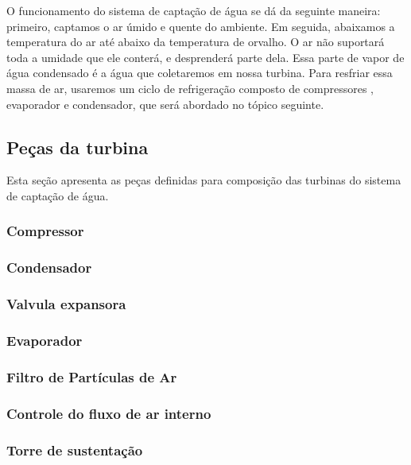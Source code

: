       O funcionamento do sistema de captação de água se dá da seguinte maneira: primeiro, captamos o ar úmido e quente do ambiente.
      Em seguida, abaixamos a temperatura do ar até abaixo da temperatura de orvalho. O ar não suportará toda a umidade que ele
      conterá, e desprenderá parte dela. Essa parte de vapor de água condensado é a água que coletaremos em nossa turbina. 
      Para resfriar essa massa de ar, usaremos um ciclo de refrigeração composto de compressores , evaporador e condensador,
      que será abordado no tópico seguinte.
    
    \subsection{Peças da turbina}
      
      Esta seção apresenta as peças definidas para composição das turbinas do sistema de captação de água.
      
    \subsubsection{Compressor}
		
	\subsubsection{Condensador}
		
	\subsubsection{Valvula expansora}
		
	\subsubsection{Evaporador}
		
	\subsubsection{Filtro de Partículas de Ar}
		
	\subsubsection{Controle do fluxo de ar interno}
		
	\subsubsection{Torre de sustentação}
		
